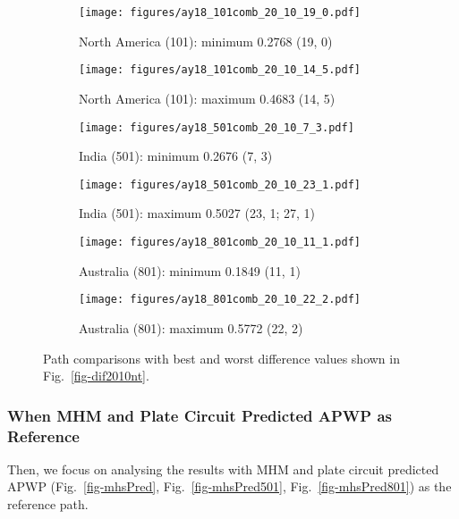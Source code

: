 \begin{figure*}
	\centering
	\begin{subfigure}{.43\textwidth}
		\texttt{[image: figures/ay18\_101comb\_20\_10\_19\_0.pdf]}
		\caption{North America (101): minimum 0.2768 (19, 0)}\label{fig-nant-2010190}
	\end{subfigure}
	\begin{subfigure}{.43\textwidth}
		\texttt{[image: figures/ay18\_101comb\_20\_10\_14\_5.pdf]}
		\caption{North America (101): maximum 0.4683 (14, 5)}\label{fig-nant-2010145}
	\end{subfigure}
	\vspace{.1em}
	\begin{subfigure}{.43\textwidth}
		\texttt{[image: figures/ay18\_501comb\_20\_10\_7\_3.pdf]}
		\caption{India (501): minimum 0.2676 (7, 3)}\label{fig-indnt-201073}
	\end{subfigure}
	\begin{subfigure}{.43\textwidth}
		\texttt{[image: figures/ay18\_501comb\_20\_10\_23\_1.pdf]}
		\caption{India (501): maximum 0.5027 (23, 1; 27, 1)}\label{fig-indnt-2010231}
	\end{subfigure}
	\vspace{.1em}
	\begin{subfigure}{.43\textwidth}
		\texttt{[image: figures/ay18\_801comb\_20\_10\_11\_1.pdf]}
		\caption{Australia (801): minimum 0.1849 (11, 1)}\label{fig-aunt-2010111}
	\end{subfigure}
	\begin{subfigure}{.43\textwidth}
		\texttt{[image: figures/ay18\_801comb\_20\_10\_22\_2.pdf]}
		\caption{Australia (801): maximum 0.5772 (22, 2)}\label{fig-aunt-2010222}
	\end{subfigure}
	\caption[Best and worst differences without shape test (20 Myr bin, 10 Myr
step)]{Path comparisons with best and worst difference values shown in
Fig.~\ref{fig-dif2010nt}.}\label{fig-dif2010ntbw}
\end{figure*}

\subsubsection{When MHM and Plate Circuit Predicted APWP as Reference}

Then, we focus on analysing the results with MHM and plate circuit predicted
APWP (Fig.~\ref{fig-mhsPred}, Fig.~\ref{fig-mhsPred501},
Fig.~\ref{fig-mhsPred801}) as the reference path.

